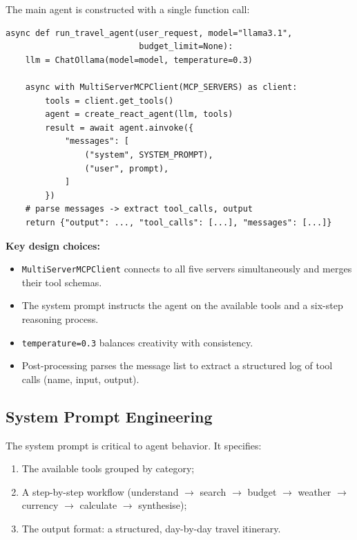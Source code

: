 \documentclass[12pt,a4paper]{article}
\begin{document}
The main agent is constructed with a single function call:

\begin{lstlisting}
async def run_travel_agent(user_request, model="llama3.1",
                           budget_limit=None):
    llm = ChatOllama(model=model, temperature=0.3)

    async with MultiServerMCPClient(MCP_SERVERS) as client:
        tools = client.get_tools()
        agent = create_react_agent(llm, tools)
        result = await agent.ainvoke({
            "messages": [
                ("system", SYSTEM_PROMPT),
                ("user", prompt),
            ]
        })
    # parse messages -> extract tool_calls, output
    return {"output": ..., "tool_calls": [...], "messages": [...]}
\end{lstlisting}

\textbf{Key design choices:}
\begin{itemize}[nosep]
  \item \texttt{MultiServerMCPClient} connects to all five servers
        simultaneously and merges their tool schemas.
  \item The system prompt instructs the agent on the available tools and
        a six-step reasoning process.
  \item \texttt{temperature=0.3} balances creativity with consistency.
  \item Post-processing parses the message list to extract a structured
        log of tool calls (name, input, output).
\end{itemize}

\subsection{System Prompt Engineering}

The system prompt is critical to agent behavior.  It specifies:

\begin{enumerate}[nosep]
  \item The available tools grouped by category;
  \item A step-by-step workflow (understand $\to$ search $\to$ budget $\to$
        weather $\to$ currency $\to$ calculate $\to$ synthesise);
  \item The output format: a structured, day-by-day travel itinerary.
\end{enumerate}

\end{document}
